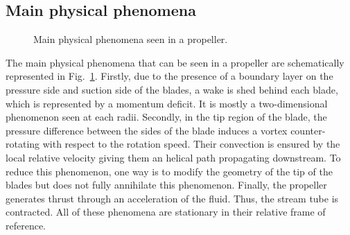 \subsection{Main physical phenomena}
\label{sub:cror_propeller_physics}

\begin{figure}[htb]
  \centering
  \quad{}
  \quad{}
  \caption{Main physical phenomena seen in a propeller.}
  \label{fig:propeller_phys_phenomena}
\end{figure}
The main physical phenomena that can be seen in a propeller are schematically represented
in Fig.~\ref{fig:propeller_phys_phenomena}. Firstly, due to the presence of a boundary
layer on the pressure side and suction side of the blades, a wake is shed behind each blade, which
is represented by a momentum deficit. It is mostly a two-dimensional
phenomenon seen at each radii. Secondly, in the tip region of the blade, the pressure difference between 
the sides of the blade induces a vortex counter-rotating with respect to 
the rotation speed. Their convection is ensured by the local relative velocity giving them
an helical path propagating downstream.
To reduce this phenomenon, one way is to modify the geometry of the tip
of the blades but does not fully annihilate this phenomenon. 
Finally, the propeller generates thrust through an acceleration of the fluid. Thus, the stream
tube is contracted. All of these phenomena are stationary in their relative frame of reference.
